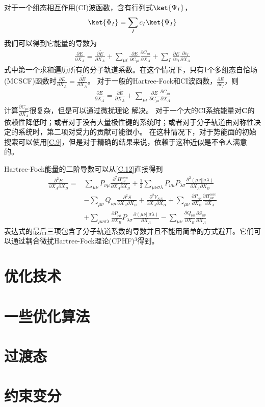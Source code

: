 对于一个组态相互作用(CI)波函数，含有行列式$\ket{\Psi _I}$，
\begin{align}
	\nonumber
    \ket{\Phi  _I}=\sum_{I}c_I\ket{\Psi _I}
\end{align}
我们可以得到它能量的导数为
\begin{align}
	\label{C.16}
	\frac{\partial E}{\partial X_A}=\frac{\partial {\tilde{E} }}{\partial X_A}
	+\sum_{\mu i}\frac{\partial E}{\partial C_{\mu i}}\frac{\partial C_{\mu i}}{\partial X_A}
	+\sum_{I}\frac{\partial E}{\partial c_{I}}\frac{\partial c_{I}}{\partial X_A}
\end{align}
式中第一个求和遍历所有的分子轨道系数。在这个情况下，只有1个多组态自恰场(MCSCF)函数时$\frac{\partial E}{\partial X_A}=\frac{\partial {\tilde{E} }}{\partial X_A}$。
对于一般的Hartree-Fock和CI波函数，$\frac{\partial E}{\partial c_{I}}$，则
\begin{align}
	\label{C.17}
	\frac{\partial E}{\partial X_A}=\frac{\partial {\tilde{E} }}{\partial X_A}
	+\sum_{\mu i}\frac{\partial E}{\partial C_{\mu i}}\frac{\partial C_{\mu i}}{\partial X_A}
\end{align}
计算$\frac{\partial C_{\mu i}}{\partial X_A}$很复杂，但是可以通过微扰理论
解决。
对于一个大的CI系统能量对$\mathbf{C}$的依赖性降低时；或者对于没有大量极性键的系统时；或者对于分子轨道由对称性决定的系统时，第二项对受力的贡献可能很小。
在这种情况下，对于势能面的初始搜索可以使用\autoref{C.9}，但是对于精确的结果来说，依赖于这种近似是不令人满意的。

Hartree-Fock能量的二阶导数可以从\autoref{C.12}直接得到
\begin{align}
	\nonumber
	\frac{\partial^2 E}{\partial X_A\partial X_B}=&\sum_{ \mu \nu }P_{\nu \mu}\frac{\partial^2 H_{\mu \nu}^{core}}{\partial X_A\partial X_B}
		+\frac{1}{2}\sum_{\mu \nu \sigma \lambda }P_{ \nu \mu }P_{\lambda \sigma}\frac{\partial^2 (\mu \nu|| \sigma\lambda)}{\partial X_A\partial X_B}
		\\ \nonumber &
		-\sum_{\mu \nu }Q_{ \nu \mu}\frac{\partial^2 S}{\partial X_A\partial X_B}
		+\frac{\partial^2 V_{NN}}{\partial X_A\partial X_B}
		+\sum_{\mu \nu }\frac{\partial P_{ \nu\mu}}{\partial X_B}\frac{\partial H_{\mu \nu}^{core}}{\partial X_A}
		\\ \nonumber &
		+\sum_{\mu \nu \sigma \lambda }\frac{\partial P_{ \nu \mu }}{\partial X_B}P_{\lambda \sigma}\frac{\partial (\mu \nu|| \sigma\lambda)}{\partial X_A}
		-\sum_{\mu \nu }\frac{\partial Q_{ \nu\mu}}{\partial X_B}\frac{\partial S_{\mu \nu}}{\partial X_A}
	\end{align}
表达式的最后三项包含了分子轨道系数的导数并且不能用简单的方式避开。它们可以通过耦合微扰Hartree-Fock理论(CPHF)$^3$得到。
\section{优化技术}
\section{一些优化算法}
\section{过渡态}
\section{约束变分}
\newpage
\theendnotes
{}
